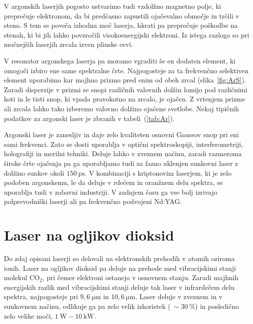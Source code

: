 V argonskih laserjih pogosto ustvarimo tudi vzdolžno magnetno polje, ki preprečuje 
elektronom, da bi predčasno zapustili ojačevalno območje in trčili v steno. S
tem se poveča izhodna moč laserja, hkrati pa preprečuje poškodbe na stenah, ki bi jih 
lahko povzročili visokoenergijski elektroni. Iz istega razloga so pri močnejših
laserjih zrcala izven plinske cevi. 

V resonator argonskega laserja pa moramo vgraditi še en dodaten element, ki omogoči
izbiro ene same spektralne črte. Najpogosteje za ta frekvenčno selektiven element
uporabimo kar majhno prizmo pred enim od obeh zrcal (slika~\ref{fig:ArS}). Zaradi disperzije
v prizmi se snopi različnih valovnih dolžin lomijo pod različnimi koti in le tisti 
snop, ki vpada pravokotno na zrcalo, je ojačen. Z vrtenjem prizme ali zrcala lahko 
tako izberemo valovno dolžino ojačene svetlobe. Nekaj tipičnih podatkov za argonski
laser je zbranih v tabeli~(\ref{tab:Ar}).

Argonski laser je zanesljiv in daje zelo kvaliteten osnovni Gaussov snop pri eni
sami frekvenci. Zato se dosti uporablja v optični spektroskopiji,
interferometriji, holografiji in merilni tehniki. Deluje lahko v zveznem načinu,
zaradi razmeroma široke črte ojačenja pa ga uporabljamo tudi za fazno uklenjen
sunkovni laser z dolžino sunkov okoli $150~\si{\pico\second}$. 
V kombinaciji s kriptonovim laserjem, ki je zelo podoben argonskemu, le da deluje
v rdečem in oranžnem delu spektra, se uporablja tudi v zabavni industriji.
V zadnjem času ga vse bolj izrivajo polprevodniški laserji ali pa frekvenčno
podvojeni Nd:YAG. 

\section{Laser na ogljikov dioksid}
Do zdaj opisani laserji so delovali na elektronskih prehodih v atomih oziroma ionih. 
Laser na ogljikov dioksid pa deluje na prehode med vibracijskimi stanji molekul 
CO$_2$, pri čemer elektroni ostanejo v osnovnem stanju.
Zaradi majhnih energijskih razlik med vibracijskimi stanji deluje
tak laser v infrardečem delu spektra, najpogosteje pri 
$9,6~\si{\micro\metre}$ in $10,6~\si{\micro\metre}$. Laser deluje v zveznem
in v sunkovnem načinu, odlikuje ga pa zelo velik izkoristek ($~\sim 30~\%$) in 
posledično zelo velike moči, $1~\si{\watt} - 10~\si{\kilo\watt}$. 

